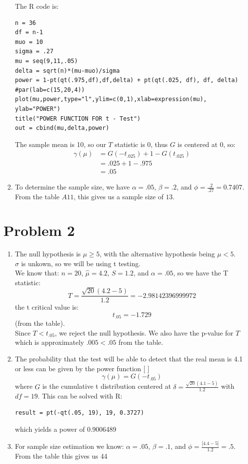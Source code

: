 \documentclass{article}
\begin{document}
\begin{enumerate}
\begin{figure}[htbp]
\end{figure}
\newpage
The R code is: \\
\begin{verbatim}
n = 36
df = n-1
muo = 10
sigma = .27
mu = seq(9,11,.05)
delta = sqrt(n)*(mu-muo)/sigma
power = 1-pt(qt(.975,df),df,delta) + pt(qt(.025, df), df, delta)
#par(lab=c(15,20,4))
plot(mu,power,type="l",ylim=c(0,1),xlab=expression(mu),
ylab="POWER")
title("POWER FUNCTION FOR t - Test")
out = cbind(mu,delta,power)
\end{verbatim}
The sample mean is 10, so our $T$ statistic is 0, thus $G$ is centered at 0, so: \\
\begin{align*}
\gamma(\mu) &= G(-t_{.025}) + 1 - G(t_{.025}) \\
&= .025 + 1 - .975 \\
&= .05
\end{align*}
\item To determine the sample size, we have $\alpha = .05$, $\beta = .2$, and $\phi = \frac{.2}{.27} = 0.7407$. From the table $A11$, this gives us a sample size of $13$. \\
\end{enumerate}
\section*{Problem 2}
\begin{enumerate}
\item The null hypothesis is $\mu \geq 5$, with the alternative hypothesis being $\mu < 5$. \\
$\sigma$ is unkown, so we will be using t testing. \\
We know that: $n = 20$, $\hat{\mu} = 4.2$, $S = 1.2$, and $\alpha = .05$, so we have the T statistic: \\
\[
T = \frac{\sqrt{20}(4.2 - 5)}{1.2} = -2.98142396999972
\]
the t critical value is: \\
\[
t_{.05} = -1.729
\]
(from the table). \\
Since $T < t_{.05}$, we reject the null hypothesis. We also have the p-value for $T$ which is approximately $.005 < .05$ from the table. \\
\item The probability that the test will be able to detect that the real mean is 4.1 or less can be given by the power function [ ]
\[
\gamma(\mu) = G(-t_{.05})
\]
where $G$ is the cumulative t distribution centered at $\delta = \frac{\sqrt{20}(4.1 - 5)}{1.2}$ with $df = 19$. This can be solved with R: \\
\begin{verbatim}
result = pt(-qt(.05, 19), 19, 0.3727)
\end{verbatim}
which yields a power of 0.9006489
\item For sample size estimation we know: $\alpha = .05$, $\beta = .1$, and $\phi = \frac{|4.4 - 5|}{1.2} = .5$. From the table this gives us 44
\end{enumerate}
\end{document}
